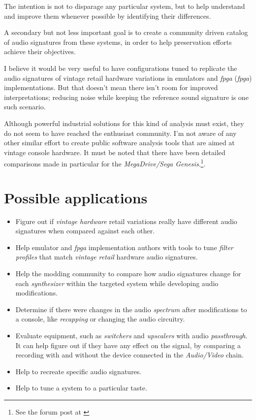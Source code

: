 \documentclass[10pt,a4paper]{report}
\newcommand{\define}[1]{\textit{\acrlong{#1}} (\textit{\acrshort{#1}})}
\newcommand{\ac}[1]{\textit{\acrshort{#1}}}
\begin{document}
The intention is not to disparage any particular system, but to help understand and improve them whenever possible by identifying their differences.

A secondary but not less important goal is to create a community driven catalog of audio signatures from these systems, in order to help preservation efforts achieve their objectives.

I believe it would be very useful to have configurations tuned to replicate the audio signatures of vintage retail hardware variations in emulators and \define{fpga} implementations. But that doesn't mean there isn't room for improved interpretations; reducing noise while keeping the reference sound signature is one such scenario.

Although powerful industrial solutions for this kind of analysis must exist, they do not seem to have reached the enthusiast community. I'm not aware of any other similar effort to create public software analysis tools that are aimed at vintage console hardware. It must be noted that there have been detailed comparisons made in particular for the \textit{MegaDrive/Sega Genesis}.\footnote{See the forum post at \cite{genesisaudio}}. 

\section{Possible applications}

\begin{itemize}
	\item Figure out if \textit{vintage hardware} retail variations really have different audio signatures when compared against each other.
	\item Help emulator and \ac{fpga} implementation authors with tools to tune \textit{filter profiles} that match \textit{vintage retail} hardware audio signatures.
	\item Help the modding community to compare how audio signatures change for each \textit{synthesizer} within the targeted system while developing audio modifications.
	\item Determine if there were changes in the audio \textit{spectrum} after modifications to a console, like \textit{recapping} or changing the audio circuitry.
	\item Evaluate equipment, such as \textit{switchers} and \textit{upscalers} with audio \textit{passthrough}. It can help figure out if they have any effect on the signal, by comparing a recording with and without the device connected in the \textit{Audio/Video} chain.
	\item Help to recreate specific audio signatures.
	\item Help to tune a system to a particular taste.
\end{itemize}
\end{document}
